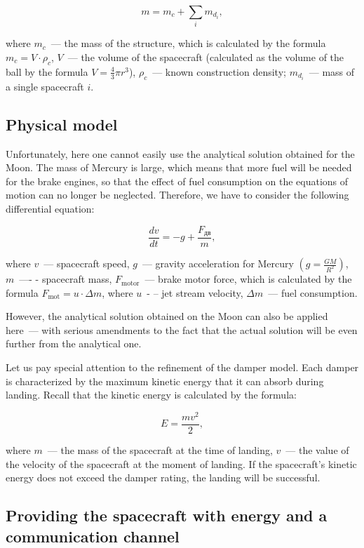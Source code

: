 \documentclass[12pt,a4paper]{article}
\begin{document}
$$
m = m_c + \sum\limits_{i}m_{d_i},
$$

where $m_c$~--- the mass of the structure, which is calculated by the formula $m_c = V \cdot \rho_c$, $V$~--- the volume of the spacecraft (calculated as the volume of the ball by the formula $V = \frac{4}{ 3}\pi
r^3$), $\rho_c$~--- known construction density; $m_{d_i}$~--- mass of a single spacecraft $i$.

\subsection{Physical model}

Unfortunately, here one cannot easily use the analytical solution obtained for the Moon. The mass of Mercury is large, which means that more fuel will be needed for the brake engines, so that the effect of fuel consumption on the equations of motion can no longer be neglected. Therefore, we have to consider the following differential equation:

$$
\frac{dv}{dt} = -g + \frac{F_{\text{дв}}}{m},
$$

where $v$~--- spacecraft speed, $g$~--- gravity acceleration for Mercury $\left(g = \frac{G M}{R^2}\right)$, $m$~—- - spacecraft mass, $F_{\text{motor}}$~--- brake motor force, which is calculated by the formula $F_{\text{mot}} = u \cdot \Delta m$, where $u$~- -- jet stream velocity, $\Delta m$~--- fuel consumption.

However, the analytical solution obtained on the Moon can also be applied here~--- with serious amendments to the fact that the actual solution will be even further from the analytical one.

Let us pay special attention to the refinement of the damper model. Each damper is characterized by the maximum kinetic energy that it can absorb during landing. Recall that the kinetic energy is calculated by the formula:

$$
E = \frac{m v^2}{2},
$$

where $m$~--- the mass of the spacecraft at the time of landing, $v$~--- the value of the velocity of the spacecraft at the moment of landing. If the spacecraft's kinetic energy does not exceed the damper rating, the landing will be successful.

\subsection{Providing the spacecraft with energy and a communication channel}
\end{document}

